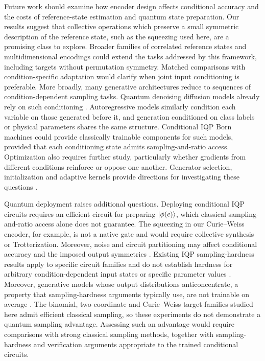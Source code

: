 \documentclass[pra,aps,10pt,twocolumn,floatfix,superscriptaddress, notitlepage,longbibliography]{revtex4-2}
\begin{document}
Future work should examine how encoder design affects conditional accuracy and the costs of reference-state estimation and quantum state preparation. Our results suggest that collective operations which preserve a small symmetric description of the reference state, such as the squeezing used here, are a promising class to explore. Broader families of correlated reference states and multidimensional encodings could extend the tasks addressed by this framework, including targets without permutation symmetry. Matched comparisons with condition-specific adaptation would clarify when joint input conditioning is preferable. More broadly, many generative architectures reduce to sequences of condition-dependent sampling tasks. Quantum denoising diffusion models already rely on such conditioning \cite{cacioppoQuantumDiffusionModels2023,quinnConditioningGenerativeQuantum2026,chenOvercomingDimensionalFactorization2026}. Autoregressive models similarly condition each variable on those generated before it, and generation conditioned on class labels or physical parameters shares the same structure. Conditional IQP Born machines could provide classically trainable components for such models, provided that each conditioning state admits sampling-and-ratio access. Optimization also requires further study, particularly whether gradients from different conditions reinforce or oppose one another. Generator selection, initialization and adaptive kernels provide directions for investigating these questions \cite{shenCharacterizingTrainability2026,lerchIQPInitialization2026,kurkinUniversalityKernelAdaptive2025}.

Quantum deployment raises additional questions. Deploying conditional IQP circuits requires an efficient circuit for preparing $\ket{\phi(c)}$, which classical sampling-and-ratio access alone does not guarantee. The squeezing in our Curie--Weiss encoder, for example, is not a native gate and would require collective synthesis or Trotterization. Moreover, noise and circuit partitioning may affect conditional accuracy and the imposed output symmetries \cite{balloShallowIQP2026,ryuDeploymentLargeIQP2026}. Existing IQP sampling-hardness results apply to specific circuit families and do not establish hardness for arbitrary condition-dependent input states or specific parameter values \cite{bremnerClassicalSimulationCommuting2011,bremnerAverageCaseComplexityApproximate2016}. Moreover, generative models whose output distributions anticoncentrate, a property that sampling-hardness arguments typically use, are not trainable on average \cite{herbstLimitsQuantumGenerative2025}. The binomial, two-coordinate and Curie--Weiss target families studied here admit efficient classical sampling, so these experiments do not demonstrate a quantum sampling advantage. Assessing such an advantage would require comparisons with strong classical sampling methods, together with sampling-hardness and verification arguments appropriate to the trained conditional circuits.
\end{document}
